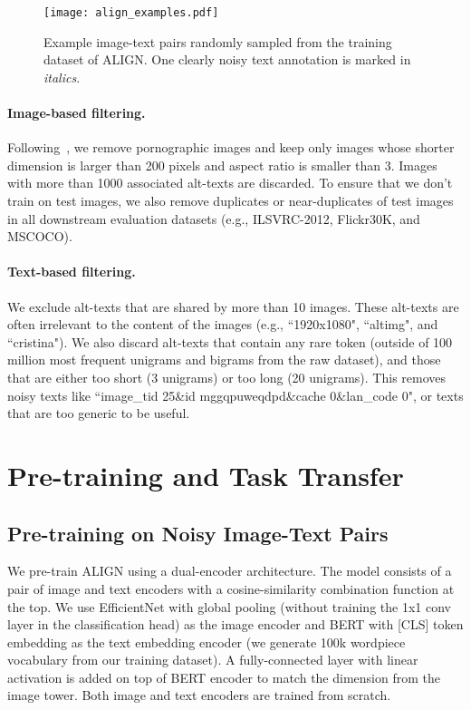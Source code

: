 \documentclass{article}
\begin{document}
\begin{figure}[!htb]
\begin{center}
    \centerline{\texttt{[image: align\_examples.pdf]}}
    \vskip -0.1in
    \caption{Example image-text pairs randomly sampled from the training dataset of ALIGN. One clearly noisy text annotation is marked in \textit{italics}.}
    \label{fig:examples}
    \vskip -0.2in
\end{center}
\end{figure}
\vspace{-2mm}
\paragraph{Image-based filtering.} Following~\citet{sharma:cc3m}, we remove pornographic images and keep only images whose shorter dimension is larger than 200 pixels and aspect ratio is smaller than 3. Images with more than 1000 associated alt-texts are discarded. To ensure that we don't train on test images, we also remove duplicates or near-duplicates of test images in all downstream evaluation datasets (e.g., ILSVRC-2012, Flickr30K, and MSCOCO).

\paragraph{Text-based filtering.} We exclude alt-texts that are shared by more than 10 images. These alt-texts are often irrelevant to the content of the images (e.g., ``1920x1080", ``alt\textunderscore img", and ``cristina"). We also discard alt-texts that contain any rare token (outside of 100 million most frequent unigrams and bigrams from the raw dataset), and those that are either too short (3 unigrams) or too long (20 unigrams). This removes noisy texts like ``image\_tid 25\&id mggqpuweqdpd\&cache 0\&lan\_code 0", or texts that are too generic to be useful.
\vspace{-2mm}

\section{Pre-training and Task Transfer}
\subsection{Pre-training on Noisy Image-Text Pairs}
We pre-train ALIGN using a dual-encoder architecture. The model consists of a pair of image and text encoders with a cosine-similarity combination function at the top. We use EfficientNet with global pooling (without training the 1x1 conv layer in the classification head) as the image encoder and BERT with [CLS] token embedding as the text embedding encoder (we generate 100k wordpiece vocabulary from our training dataset). A fully-connected layer with linear activation is added on top of BERT encoder to match the dimension from the image tower. Both image and text encoders are trained from scratch.
\end{document}
